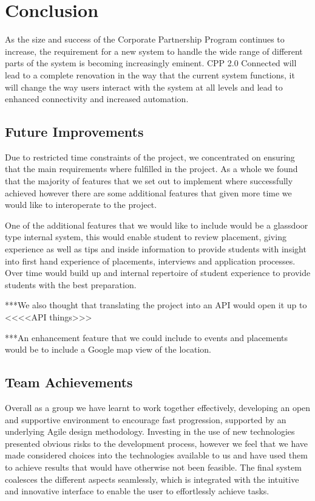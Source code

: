 \section{Conclusion}
As the size and success of the Corporate Partnership Program continues to increase, the requirement for a new system to handle the wide range of different parts of the system is becoming increasingly eminent. CPP 2.0 Connected will lead to a complete renovation in the way that the current system functions, it will change the way users interact with the system at all levels and lead to enhanced connectivity and increased automation.
	
	\subsection{Future Improvements}
		Due to restricted time constraints of the project, we concentrated on ensuring that the main requirements where fulfilled in the project. As a whole we found that the majority of features that we set out to implement where successfully achieved however there are some additional features that given more time we would like to interoperate to the project.

		One of the additional features that we would like to include would be a glassdoor type internal system, this would enable student to review placement, giving experience as well as tips and inside information to provide students with insight into first hand experience of placements, interviews and application processes. Over time would build up and internal repertoire of student experience to provide students with the best preparation.

		***We also thought that translating the project into an API would open it up to <<<<API things>>>
		
		***An enhancement feature that we could include to events and placements would be to include a Google map view of the location.

	\subsection{Team Achievements}
		Overall as a group we have learnt to work together effectively, developing an open and supportive environment to encourage fast progression, supported by an underlying Agile design methodology.
		Investing in the use of new technologies presented obvious risks to the development process, however we feel that we have made considered choices into the technologies available to us and have used them to achieve results that would have otherwise not been feasible. The final system coalesces the different aspects seamlessly, which is integrated with the intuitive and innovative interface to enable the user to effortlessly achieve tasks.
		
